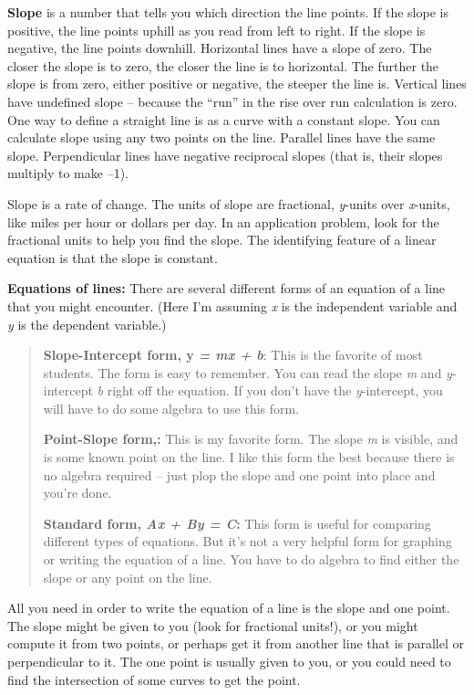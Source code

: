 \textbf{Slope} is a number that tells you which direction the line
points. If the slope is positive, the line points uphill as you read
from left to right. If the slope is negative, the line points downhill.
Horizontal lines have a slope of zero. The closer the slope is to zero,
the closer the line is to horizontal. The further the slope is from
zero, either positive or negative, the steeper the line is. Vertical
lines have undefined slope -- because the ``run'' in the rise over run
calculation is zero. One way to define a straight line is as a curve
with a constant slope. You can calculate slope using any two points on
the line. Parallel lines have the same slope. Perpendicular lines have
negative reciprocal slopes (that is, their slopes multiply to make --1).

Slope is a rate of change. The units of slope are fractional,
\emph{y}-units over \emph{x}-units, like miles per hour or dollars per
day. In an application problem, look for the fractional units to help
you find the slope. The identifying feature of a linear equation is that
the slope is constant.

\textbf{Equations of lines:} There are several different forms of an
equation of a line that you might encounter. (Here I'm assuming \emph{x}
is the independent variable and \emph{y} is the dependent variable.)

\begin{quote}
\textbf{Slope-Intercept form, y \emph{= mx + b}}: This is the favorite
of most students. The form is easy to remember. You can read the slope
\emph{m} and \emph{y}-intercept \emph{b} right off the equation. If you
don't have the \emph{y}-intercept, you will have to do some algebra to
use this form.

\textbf{Point-Slope form,:} This is my favorite form. The slope \emph{m}
is visible, and is some known point on the line. I like this form the
best because there is no algebra required -- just plop the slope and one
point into place and you're done.

\textbf{Standard form, \emph{Ax + By = C}:} This form is useful for
comparing different types of equations. But it's not a very helpful form
for graphing or writing the equation of a line. You have to do algebra
to find either the slope or any point on the line.
\end{quote}

All you need in order to write the equation of a line is the slope and
one point. The slope might be given to you (look for fractional units!),
or you might compute it from two points, or perhaps get it from another
line that is parallel or perpendicular to it. The one point is usually
given to you, or you could need to find the intersection of some curves
to get the point.

